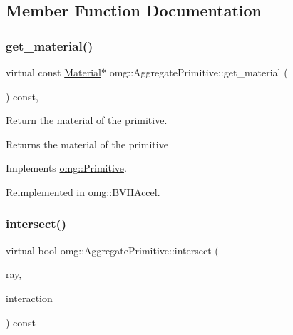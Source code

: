 \subsection{Member Function Documentation}
\mbox{\label{classomg_1_1_aggregate_primitive_a339e9fe3ab8e2c0c68c888345b834c21}} 
\subsubsection{\texorpdfstring{get\_material()}{get\_material()}}
{\footnotesize\ttfamily virtual const \mbox{\hyperlink{classomg_1_1_material}{Material}}$\ast$ omg\+::\+Aggregate\+Primitive\+::get\+\_\+material (\begin{DoxyParamCaption}{ }\end{DoxyParamCaption}) const\hspace{0.3cm}{\ttfamily [inline]}, {\ttfamily [virtual]}}



Return the material of the primitive. 

\begin{DoxyReturn}{Returns}
the material of the primitive 
\end{DoxyReturn}


Implements \mbox{\hyperlink{classomg_1_1_primitive_ad9cb98c6f74581d53cadf800fc506333}{omg\+::\+Primitive}}.



Reimplemented in \mbox{\hyperlink{classomg_1_1_b_v_h_accel_afc47144553f2de1a23c4053e56747eee}{omg\+::\+B\+V\+H\+Accel}}.

\mbox{\label{classomg_1_1_aggregate_primitive_a07ab041d9071295e4f648475c7163470}} 
\subsubsection{\texorpdfstring{intersect()}{intersect()}\hspace{0.1cm}{\footnotesize\ttfamily [1/2]}}
{\footnotesize\ttfamily virtual bool omg\+::\+Aggregate\+Primitive\+::intersect (\begin{DoxyParamCaption}\item[{const \mbox{\hyperlink{classomg_1_1_ray}{Ray}} \&}]{ray,  }\item[{\mbox{\hyperlink{classomg_1_1_surface_interaction}{Surface\+Interaction}} $\ast$}]{interaction }\end{DoxyParamCaption}) const\hspace{0.3cm}{\ttfamily [pure virtual]}}



